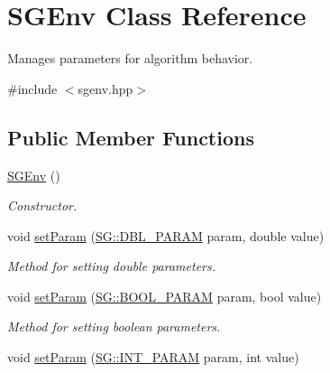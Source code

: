 \hypertarget{classSGEnv}{}\section{S\+G\+Env Class Reference}
\label{classSGEnv}


Manages parameters for algorithm behavior.  




{\ttfamily \#include $<$sgenv.\+hpp$>$}

\subsection*{Public Member Functions}
\begin{DoxyCompactItemize}
\item 
\hyperlink{classSGEnv_ac7fe265f0baba4e498c36bd67a0bbc97}{S\+G\+Env} ()
\begin{DoxyCompactList}\small\item\em Constructor. \end{DoxyCompactList}\item 
\mbox{\label{classSGEnv_adfa101d39534519c80b33a78454b01e2}} 
void \hyperlink{classSGEnv_adfa101d39534519c80b33a78454b01e2}{set\+Param} (\hyperlink{namespaceSG_ac2f86c953fcec4419ac86538d9d314b6}{S\+G\+::\+D\+B\+L\+\_\+\+P\+A\+R\+AM} param, double value)
\begin{DoxyCompactList}\small\item\em Method for setting double parameters. \end{DoxyCompactList}\item 
\mbox{\label{classSGEnv_a94d5a63cc1023e86e239b203c86dca8d}} 
void \hyperlink{classSGEnv_a94d5a63cc1023e86e239b203c86dca8d}{set\+Param} (\hyperlink{namespaceSG_a0b164afe6c58be3386d9e3f6e857b673}{S\+G\+::\+B\+O\+O\+L\+\_\+\+P\+A\+R\+AM} param, bool value)
\begin{DoxyCompactList}\small\item\em Method for setting boolean parameters. \end{DoxyCompactList}\item 
\mbox{\label{classSGEnv_ab34537d887371f2f1e1af3d13f2c0d0a}} 
void \hyperlink{classSGEnv_ab34537d887371f2f1e1af3d13f2c0d0a}{set\+Param} (\hyperlink{namespaceSG_a031898e6fc0fa14d8590f85da9715f37}{S\+G\+::\+I\+N\+T\+\_\+\+P\+A\+R\+AM} param, int value)

\end{DoxyCompactItemize}
